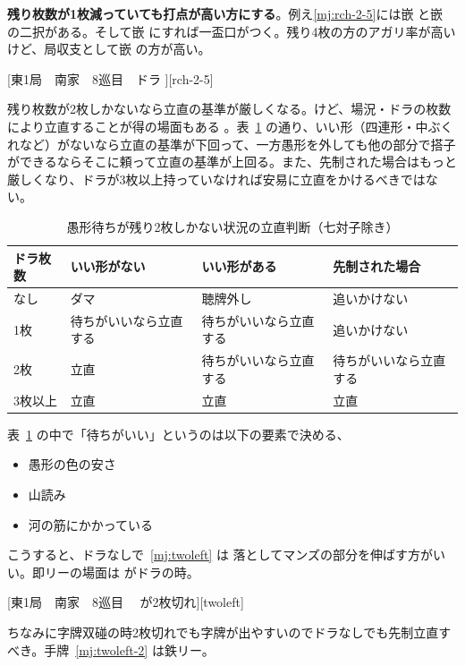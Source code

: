 \documentclass[../nankiru_main.tex]{subfiles}
\begin{document}
\textbf{残り枚数が1枚減っていても打点が高い方にする}\citep[][pp. 91--92]{miinin-choice}。例え\ref{mj:rch-2-5}には嵌  と嵌  の二択がある。そして嵌  にすれば一盃口がつく。残り4枚の方のアガリ率が高いけど、局収支として嵌  の方が高い。

[東1局　南家　8巡目　ドラ ][rch-2-5]

残り枚数が2枚しかないなら立直の基準が厳しくなる。けど、場況・ドラの枚数により立直することが得の場面もある \citep{yoteru-twoleft}。表~\ref{tab:gukei-twoleft} の通り、いい形（四連形・中ぶくれなど）がないなら立直の基準が下回って、一方愚形を外しても他の部分で搭子ができるならそこに頼って立直の基準が上回る。また、先制された場合はもっと厳しくなり、ドラが3枚以上持っていなければ安易に立直をかけるべきではない。

\begin{table}[t]
  \centering
  \begin{tabular}{l|lll}
    ドラ枚数 & いい形がない & いい形がある & 先制された場合 \\
    \hline
    なし & ダマ & 聴牌外し & 追いかけない \\
    1枚 & 待ちがいいなら立直する & 待ちがいいなら立直する & 追いかけない \\
    2枚 & 立直 & 待ちがいいなら立直する & 待ちがいいなら立直する \\
    3枚以上 & 立直 & 立直 & 立直
  \end{tabular}
  \caption{愚形待ちが残り2枚しかない状況の立直判断（七対子除き）\citep{yoteru-twoleft}}
  \label{tab:gukei-twoleft}
\end{table}

表~\ref{tab:gukei-twoleft} の中で「待ちがいい」というのは以下の要素で決める、

\begin{itemize}
\item 愚形の色の安さ
\item 山読み
\item 河の筋にかかっている
\end{itemize}

こうすると、ドラなしで~\ref{mj:twoleft} は  落としてマンズの部分を伸ばす方がいい。即リーの場面は  がドラの時。

[東1局　南家　8巡目　 が2枚切れ][twoleft]

ちなみに字牌双碰の時2枚切れでも字牌が出やすいのでドラなしでも先制立直すべき。手牌~\ref{mj:twoleft-2} は鉄リー。
\end{document}

